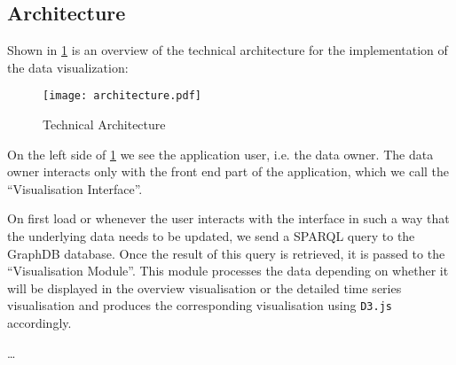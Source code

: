 \documentclass[../paper.tex]{subfiles}
\begin{document}
  \subsection{Architecture}

  Shown in \cref{fig:architecture} is an overview of the technical architecture
  for the implementation of the data visualization:

  \begin{figure}
    \centering
    \texttt{[image: architecture.pdf]}
    \caption{Technical Architecture}
    \label{fig:architecture}
  \end{figure}

  On the left side of \cref{fig:architecture} we see the application user, i.e.
  the data owner. The data owner interacts only with the front end part of the
  application, which we call the “Visualisation Interface”.

  On first load or whenever the user interacts with the interface in such a way
  that the underlying data needs to be updated, we send a SPARQL query to the
  GraphDB database. Once the result of this query is retrieved, it is passed to
  the “Visualisation Module”. This module processes the data depending on
  whether it will be displayed in the overview visualisation or the detailed
  time series visualisation and produces the corresponding visualisation
  using \texttt{D3.js} accordingly.


  …
\end{document}
